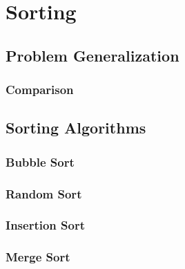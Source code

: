 \chapter{Sorting}


\section{Problem Generalization}

\subsection{Comparison}
\csharpsubsubsection{\csharp}

\section{Sorting Algorithms}

\subsection{Bubble Sort}
\csharpsubsubsection{\csharp}

\subsection{Random Sort}
\csharpsubsubsection{\csharp}

\subsection{Insertion Sort}
\csharpsubsubsection{\csharp}

\subsection{Merge Sort}
\csharpsubsubsection{\csharp}

